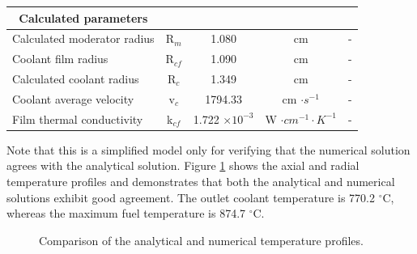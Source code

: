 \begin{table}[htbp!]
\begin{tabular}{@{}l c c c c}
    \midrule
  \multicolumn{1}{c}{Calculated parameters} &  &  &  & \\  
    \midrule
  Calculated moderator radius  & R$_m$ & 1.080  	& cm    & - \\
  Coolant film radius   		   & R$_{cf}$ & 1.090  	& cm    & - \\
  Calculated coolant radius 	 & R$_c$ & 1.349  	& cm    & - \\
  Coolant average velocity  	 & v$_c$ & 1794.33 	& cm $\cdot s^{-1}$ & - \\
  Film thermal conductivity  	 & k$_{cf}$ & 1.722 $\times 10^{-3}$ & W $\cdot cm^{-1} \cdot K^{-1}$ & - \\
  \bottomrule
  \end{tabular}
\end{table}

Note that this is a simplified model only for verifying that the numerical solution agrees with the analytical solution.
Figure \ref{fig:th-ver-results} shows the axial and radial temperature profiles and demonstrates that both the analytical and numerical solutions exhibit good agreement.
The outlet coolant temperature is 770.2 $^{\circ}$C, whereas the maximum fuel temperature is 874.7 $^{\circ}$C.

\begin{figure}[htbp!]
	\centering
	\hfill
    \caption{Comparison of the analytical and numerical temperature profiles.}
	\label{fig:th-ver-results}
\end{figure}

